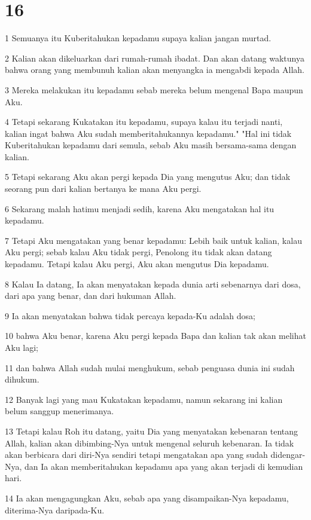 \chapter{16}

\par 1 Semuanya itu Kuberitahukan kepadamu supaya kalian jangan murtad.
\par 2 Kalian akan dikeluarkan dari rumah-rumah ibadat. Dan akan datang waktunya bahwa orang yang membunuh kalian akan menyangka ia mengabdi kepada Allah.
\par 3 Mereka melakukan itu kepadamu sebab mereka belum mengenal Bapa maupun Aku.
\par 4 Tetapi sekarang Kukatakan itu kepadamu, supaya kalau itu terjadi nanti, kalian ingat bahwa Aku sudah memberitahukannya kepadamu." "Hal ini tidak Kuberitahukan kepadamu dari semula, sebab Aku masih bersama-sama dengan kalian.
\par 5 Tetapi sekarang Aku akan pergi kepada Dia yang mengutus Aku; dan tidak seorang pun dari kalian bertanya ke mana Aku pergi.
\par 6 Sekarang malah hatimu menjadi sedih, karena Aku mengatakan hal itu kepadamu.
\par 7 Tetapi Aku mengatakan yang benar kepadamu: Lebih baik untuk kalian, kalau Aku pergi; sebab kalau Aku tidak pergi, Penolong itu tidak akan datang kepadamu. Tetapi kalau Aku pergi, Aku akan mengutus Dia kepadamu.
\par 8 Kalau Ia datang, Ia akan menyatakan kepada dunia arti sebenarnya dari dosa, dari apa yang benar, dan dari hukuman Allah.
\par 9 Ia akan menyatakan bahwa tidak percaya kepada-Ku adalah dosa;
\par 10 bahwa Aku benar, karena Aku pergi kepada Bapa dan kalian tak akan melihat Aku lagi;
\par 11 dan bahwa Allah sudah mulai menghukum, sebab penguasa dunia ini sudah dihukum.
\par 12 Banyak lagi yang mau Kukatakan kepadamu, namun sekarang ini kalian belum sanggup menerimanya.
\par 13 Tetapi kalau Roh itu datang, yaitu Dia yang menyatakan kebenaran tentang Allah, kalian akan dibimbing-Nya untuk mengenal seluruh kebenaran. Ia tidak akan berbicara dari diri-Nya sendiri tetapi mengatakan apa yang sudah didengar-Nya, dan Ia akan memberitahukan kepadamu apa yang akan terjadi di kemudian hari.
\par 14 Ia akan mengagungkan Aku, sebab apa yang disampaikan-Nya kepadamu, diterima-Nya daripada-Ku.
